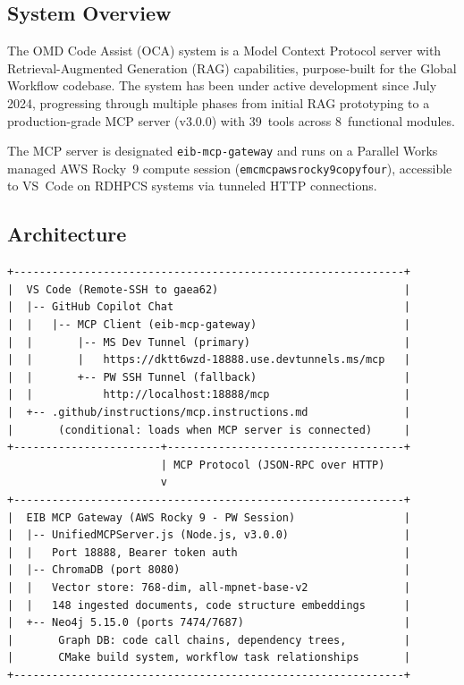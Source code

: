 \documentclass[11pt,letterpaper,twoside]{article}
\begin{document}
\subsection{System Overview}

The OMD Code Assist (OCA) system is a Model Context Protocol server with
Retrieval-Augmented Generation (RAG) capabilities, purpose-built for the
Global Workflow codebase. The system has been under active development since
July 2024, progressing through multiple phases from initial RAG prototyping
to a production-grade MCP server (v3.0.0) with 39~tools across
8~functional modules.

The MCP server is designated \texttt{eib-mcp-gateway} and runs on a Parallel
Works managed AWS Rocky~9 compute session
(\texttt{emcmcpawsrocky9copyfour}), accessible to VS~Code on RDHPCS systems
via tunneled HTTP connections.

\subsection{Architecture}

\begin{lstlisting}[style=diagram]
+-------------------------------------------------------------+
|  VS Code (Remote-SSH to gaea62)                             |
|  |-- GitHub Copilot Chat                                    |
|  |   |-- MCP Client (eib-mcp-gateway)                       |
|  |       |-- MS Dev Tunnel (primary)                        |
|  |       |   https://dktt6wzd-18888.use.devtunnels.ms/mcp   |
|  |       +-- PW SSH Tunnel (fallback)                       |
|  |           http://localhost:18888/mcp                     |
|  +-- .github/instructions/mcp.instructions.md               |
|       (conditional: loads when MCP server is connected)     |
+-----------------------+-------------------------------------+
                        | MCP Protocol (JSON-RPC over HTTP)
                        v
+-------------------------------------------------------------+
|  EIB MCP Gateway (AWS Rocky 9 - PW Session)                 |
|  |-- UnifiedMCPServer.js (Node.js, v3.0.0)                  |
|  |   Port 18888, Bearer token auth                          |
|  |-- ChromaDB (port 8080)                                   |
|  |   Vector store: 768-dim, all-mpnet-base-v2               |
|  |   148 ingested documents, code structure embeddings      |
|  +-- Neo4j 5.15.0 (ports 7474/7687)                         |
|       Graph DB: code call chains, dependency trees,         |
|       CMake build system, workflow task relationships       |
+-------------------------------------------------------------+
\end{lstlisting}
\end{document}
